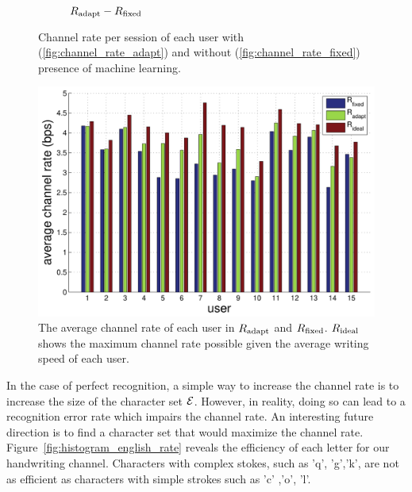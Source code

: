 \documentclass{sigchi}
\begin{document}
\begin{figure}
\begin{subfigure}[b]{\columnwidth}
    \caption{$R_{\mathrm{adapt}} - R_{\mathrm{fixed}}$}
    \label{fig:channel_rate_diff}
  \end{subfigure}
  \label{fig:channel_rate}
  \caption{Channel rate per session of each user with
    (\ref{fig:channel_rate_adapt}) and without (\ref{fig:channel_rate_fixed})
    presence of machine learning. }
\end{figure}

\begin{figure}
  \centering
  \includegraphics[width=.9\columnwidth]{figures/IUI_user_summary.pdf}   
  \caption{The average channel rate of each user in $R_{\mathrm{adapt}}$ and
    $R_{\mathrm{fixed}}$. $R_{\mathrm{ideal}}$ shows the maximum channel rate possible given the
    average writing speed of each user. }
  \label{fig:channel_rate_per_user}
\end{figure}

In the case of perfect recognition, a simple way to increase the
channel rate is to increase the size of the character set
$\mathcal{E}$. However, in reality, doing so can lead to a
recognition error rate which impairs the channel rate. An interesting
future direction is to find a character set that would maximize the channel
rate. Figure~\ref{fig:histogram_english_rate} reveals the efficiency of each
letter for our handwriting channel. Characters with complex stokes,
such as 'q', 'g','k', are not as efficient as characters with simple
strokes such as 'c' ,'o', 'l'. 
\end{document}
